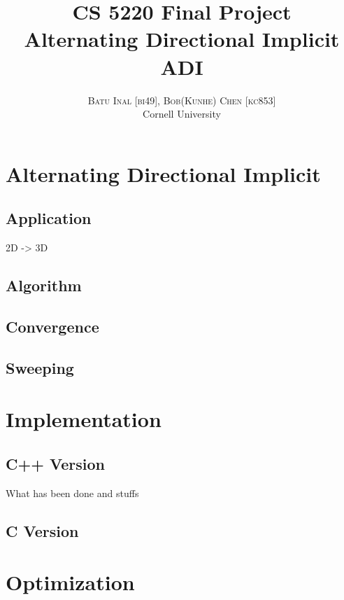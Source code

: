 \documentclass[a4paper,11pt]{article}
\title{\vspace{-15mm}\fontsize{24pt}{10pt}\selectfont\textbf{CS 5220 Final Project \\ \Large Alternating Directional Implicit ADI}} %
\author{
\large
\textsc{Batu Inal [bi49], Bob(Kunhe) Chen [kc853]}\\
\normalsize Cornell University \\ %
[2mm] 
\vspace{-20mm}
}
\date{}
\begin{document}
\setlength{\textwidth}{500pt}
\maketitle %
\thispagestyle{fancy} %
\begin{abstract}
\noindent %
\end{abstract}
\begin{multicols}{2}
\section{Alternating Directional Implicit}
	\subsection{Application} 2D -> 3D
	\subsection{Algorithm}
	\subsection{Convergence}
	\subsection{Sweeping}
\section{Implementation}
	\subsection{C++ Version} What has been done and stuffs
	\subsection{C Version}
\section{Optimization}

\end{multicols}
\end{document}
